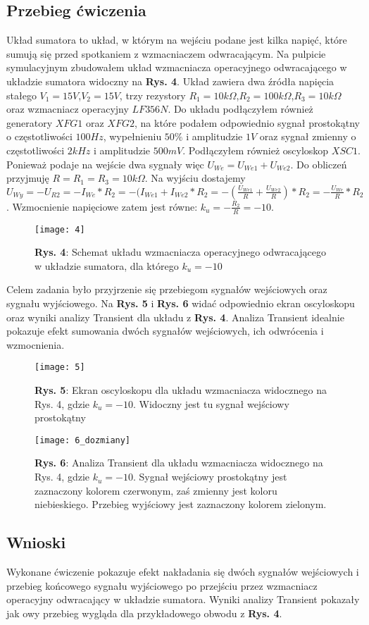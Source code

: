\documentclass[11pt]{article}
\begin{document}
\subsection{Przebieg ćwiczenia}
Układ sumatora to układ, w którym na wejściu podane jest kilka napięć, które sumują się przed spotkaniem z wzmacniaczem odwracającym. Na pulpicie symulacyjnym zbudowałem układ wzmacniacza operacyjnego odwracającego w układzie sumatora widoczny na \textbf{Rys. 4}. Układ zawiera dwa źródła napięcia stałego $V_1=15V$,$V_2=15V$, trzy rezystory $R_1=10k\Omega$,$R_2=100k\Omega$,$R_3=10k\Omega$ oraz wzmacniacz operacyjny $LF356N$.
Do układu podłączyłem również generatory $XFG1$ oraz $XFG2$, na które podałem odpowiednio sygnał prostokątny o częstotliwości $100Hz$, wypełnieniu $50\%$ i amplitudzie $1V$ oraz sygnał zmienny o częstotliwości $2kHz$ i amplitudzie $500mV$. Podłączyłem również oscyloskop $XSC1$. Ponieważ podaje na wejście dwa
sygnały więc $U_{We}=U_{We1}+U_{We2}$. Do obliczeń przyjmuję $R=R_1=R_3=10k\Omega$. Na wyjściu dostajemy $U_{Wy}=-U_{R2}=-I_{We}*R_2=-(I_{We1}+I_{We2}*R_2=-(\frac{U_{We1}}{R}+\frac{U_{We2}}{R})*R_2=-\frac{U_{We}}{R}*R_2$. Wzmocnienie napięciowe zatem jest równe: $k_u=-\frac{R_2}{R}=-10$.
\begin{figure}[H]
\centering
\texttt{[image: 4]}
\caption*{\textbf{Rys. 4}: Schemat układu wzmacniacza operacyjnego odwracającego w układzie sumatora, dla którego $k_u=-10$}
\end{figure}
\noindent Celem zadania było przyjrzenie się przebiegom sygnałów wejściowych oraz sygnału wyjściowego. Na \textbf{Rys. 5} i \textbf{Rys. 6} widać odpowiednio ekran oscyloskopu oraz wyniki analizy Transient dla układu z \textbf{Rys. 4}. Analiza Transient idealnie pokazuje efekt sumowania dwóch sygnałów wejściowych,
ich odwrócenia i wzmocnienia. 
\begin{figure}[H]
\centering
\texttt{[image: 5]}
\caption*{\textbf{Rys. 5}: Ekran oscyloskopu dla układu wzmacniacza widocznego na Rys. 4, gdzie $k_u=-10$. Widoczny jest tu sygnał wejściowy prostokątny}
\end{figure}
\begin{figure}[H]
\centering
\texttt{[image: 6\_dozmiany]}
\caption*{\textbf{Rys. 6}: Analiza Transient dla układu wzmacniacza widocznego na Rys. 4, gdzie $k_u=-10$. Sygnał wejściowy prostokątny jest zaznaczony kolorem czerwonym, zaś zmienny jest koloru niebieskiego. Przebieg wyjściowy jest zaznaczony kolorem zielonym. }
\end{figure}
\subsection{Wnioski}
Wykonane ćwiczenie pokazuje efekt nakładania się dwóch sygnałów wejściowych i przebieg końcowego sygnału wyjściowego po przejściu przez wzmacniacz operacyjny odwracający w układzie sumatora. Wyniki analizy Transient pokazały jak owy przebieg wygląda dla przykładowego obwodu z \textbf{Rys. 4}.
\end{document}
